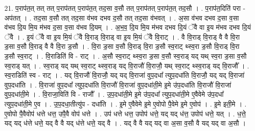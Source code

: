 \documentclass[17pt]{extarticle}
\begin{document}
21. प॒राप॑त॒त् तत् तत् प॒राप॑तत् प॒राप॑त॒त् तद॒सा व॒सौ तत् प॒राप॑तत् प॒राप॑त॒त् तद॒सौ । . प॒राप॑त॒दिति॑ परा - अप॑तत् । . तद॒सा व॒सौ तत् तद॒सा व॑भव दभव द॒सौ तत् तद॒सा व॑भवत् । . अ॒सा व॑भव दभव द॒सा व॒सा व॑भव दि॒य मि॒य म॑भव द॒सा व॒सा व॑भव दि॒यम् । . अ॒भ॒व॒ दि॒य मि॒य म॑भव दभव दि॒यं ॅवै वा इ॒य म॑भव दभव दि॒यं ॅवै । . इ॒यं ॅवै वा इ॒य मि॒यं ॅवै वि॒राड् वि॒राड् वा इ॒य मि॒यं ॅवै वि॒राट् । . वै वि॒राड् वि॒राड् वै वै वि॒रा ड॒सा व॒सौ वि॒राड् वै वै वि॒रा ड॒सौ । . वि॒रा ड॒सा व॒सौ वि॒राड् वि॒रा ड॒सौ स्व॒राट् थ्स्व॒रा ड॒सौ वि॒राड् वि॒रा ड॒सौ स्व॒राट् । . वि॒राडिति॑ वि - राट् । . अ॒सौ स्व॒राट् थ्स्व॒रा ड॒सा व॒सौ स्व॒राड् यद् यथ् स्व॒रा ड॒सा व॒सौ स्व॒राड् यत् । . स्व॒राड् यद् यथ् स्व॒राट् थ्स्व॒राड् यद् वि॒राजौ॑ वि॒राजौ॒ यथ् स्व॒राट् थ्स्व॒राड् यद् वि॒राजौ᳚ । . स्व॒राडिति॑ स्व - राट् । . यद् वि॒राजौ॑ वि॒राजौ॒ यद् यद् वि॒राजा॑ वुप॒दधा᳚ त्युप॒दधा॑ति वि॒राजौ॒ यद् यद् वि॒राजा॑ वुप॒दधा॑ति । . वि॒राजा॑ वुप॒दधा᳚ त्युप॒दधा॑ति वि॒राजौ॑ वि॒राजा॑ वुप॒दधा॑ती॒मे इ॒मे उ॑प॒दधा॑ति वि॒राजौ॑ वि॒राजा॑ वुप॒दधा॑ती॒मे । . वि॒राजा॒विति॑ वि - राजौ᳚ । . उ॒प॒दधा॑ती॒मे इ॒मे उ॑प॒दधा᳚ त्युप॒दधा॑ती॒मे ए॒वैवेमे उ॑प॒दधा᳚ त्युप॒दधा॑ती॒मे ए॒व । . उ॒प॒दधा॒तीत्यु॑प - दधा॑ति । . इ॒मे ए॒वैवेमे इ॒मे ए॒वोपो पै॒वेमे इ॒मे ए॒वोप॑ । . इ॒मे इती॒मे । . ए॒वोपो पै॒वैवोप॑ धत्ते धत्त॒ उपै॒वै वोप॑ धत्ते । . उप॑ धत्ते धत्त॒ उपोप॑ धत्ते॒ यद् यद् ध॑त्त॒ उपोप॑ धत्ते॒ यत् । . ध॒त्ते॒ यद् यद् ध॑त्ते धत्ते॒ यद् वै वै यद् ध॑त्ते धत्ते॒ यद् वै । . यद् वै वै यद् यद् वा अ॒सा व॒सौ वै यद् यद् वा अ॒सौ । \newline
\end{document}
